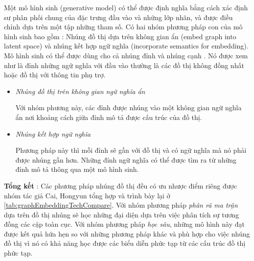 Một mô hình sinh (generative model) có thể được định nghĩa bằng cách xác định sư phân phối chung của đặc trưng đầu vào và những lớp nhãn, và được điều chỉnh dựa trên một tập những tham số. Có hai nhóm phương pháp con của mô hình sinh bao gồm : Nhúng đồ thị dựa trên không gian ẩn (embed graph into latent space) và nhúng kết hợp ngữ nghĩa (incorporate semantics for embedding).
Mô hình sinh có thể được dùng cho cả nhúng đỉnh và nhúng cạnh . Nó được xem như là đỉnh những ngữ nghĩa với đầu vào thường là các đồ thị không đồng nhất hoặc đồ thị với thông tin phụ trợ.
\begin{itemize}
	\item \textit{Nhúng đồ thị trên không gian ngữ nghĩa ẩn}
	
	Với nhóm phương này, các đỉnh được nhúng vào một không gian ngữ nghĩa ẩn nơi khoảng cách giữa đỉnh mô tả được cấu trúc của đồ thị.
	
	\item \textit{Nhúng kết hợp ngữ nghĩa}
	
	Phương pháp này thì mỗi đỉnh sẽ gần với đồ thị và có ngữ nghĩa mà nó phải được nhúng gần hơn. Những đỉnh ngữ nghĩa có thể được tìm ra từ những đỉnh mô tả thông qua một mô hình sinh.
\end{itemize}

\textbf{Tổng kết} : Các phương pháp nhúng đồ thị đều có ưu nhược điểm riêng được nhóm tác giả Cai, Hongyun\cite{cai2018comprehensive} tổng hợp và trình bày lại ở \autoref{tab:graphEmbeddingTechCompare}. Với nhóm phương pháp \textit{phân rã ma trận} dựa trên đồ thị nhúng sẽ học những đại diện dựa trên việc phân tích sự tương đồng các cặp toàn cục. Với nhóm phương pháp \textit{học sâu}, những mô hình này đạt được kết quả hứa hẹn so với những phương pháp khác và phù hợp cho việc nhúng đồ thị vì nó có khả năng học được các biểu diễn phức tạp từ các cấu trúc đồ thị phức tạp. 



